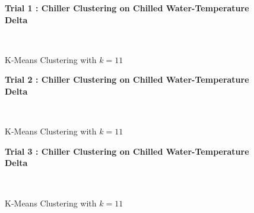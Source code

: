 \begin{figure}[!h]
\centerline{\bfseries\Large Trial 1 : Chiller Clustering on Chilled Water-Temperature Delta}\\
\caption{K-Means Clustering with $k=11$}
\end{figure}
\begin{figure}[!h]
\centerline{\bfseries\Large Trial 2 : Chiller Clustering on Chilled Water-Temperature Delta}\\
\caption{K-Means Clustering with $k=11$}
\end{figure}
\begin{figure}[!h]
\centerline{\bfseries\Large Trial 3 : Chiller Clustering on Chilled Water-Temperature Delta}\\
\caption{K-Means Clustering with $k=11$}
\end{figure}
